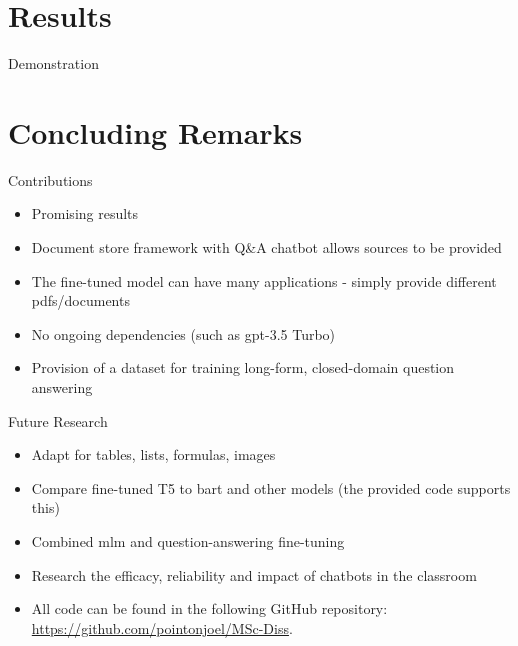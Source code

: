 \documentclass[aspectratio=169,12pt]{beamer}
\begin{document}
\section{Results}
\begin{frame}[t]{Demonstration}

\end{frame}


\section{Concluding Remarks}
\begin{frame}{Contributions}
    \begin{itemize}
        \item Promising results
        \item Document store framework with Q\&A chatbot allows sources to be provided
        \item The fine-tuned model can have many applications - simply provide different \acrshort{pdf}s/documents
        \item No ongoing dependencies (such as \acrshort{gpt}-3.5 Turbo)
        \item Provision of a dataset for training long-form, closed-domain question answering
    \end{itemize}
\end{frame}

\begin{frame}{Future Research}
    \begin{itemize}
        \item Adapt for tables, lists, formulas, images
        \item Compare fine-tuned T5 to \acrshort{bart} and other models (the provided code supports this) 
        \item Combined \acrshort{mlm} and question-answering fine-tuning
        \item Research the efficacy, reliability and impact of chatbots in the classroom
        \item All code can be found in the following GitHub repository: \url{https://github.com/pointonjoel/MSc-Diss}.
    \end{itemize}
\end{frame}
\end{document}

